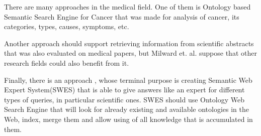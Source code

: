 		There are many approaches in the medical field. One of them is Ontology based Semantic Search Engine for Cancer\cite{Raj14} that was made for analysis of cancer, its categories, types, causes, symptoms, etc. 
		
		Another approach\cite{Mil05} should support retrieving information from scientific abstracts that was also evaluated on medical papers, but Milward et. al. suppose that other research fields could also benefit from it.
		
		Finally, there is an approach \cite{Ver15}, whose terminal purpose is creating Semantic Web Expert System(SWES) that is able to give answers like an expert for different types of queries, in particular scientific ones. SWES should use Ontology Web Search Engine that will look for already existing and available ontologies in the Web, index, merge them and allow using of all knowledge that is accumulated in them.                 